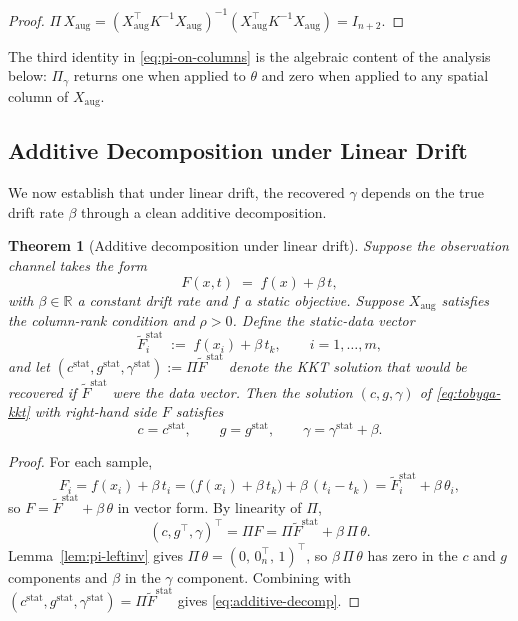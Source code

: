 \documentclass[11pt,a4paper]{article}
\newcommand{\R}{\mathbb{R}}
\newtheorem{theorem}{Theorem}[section]
\begin{document}
\begin{proof}
$\Pi\,X_{\mathrm{aug}}
= (X_{\mathrm{aug}}^\top K^{-1} X_{\mathrm{aug}})^{-1}
  (X_{\mathrm{aug}}^\top K^{-1} X_{\mathrm{aug}}) = I_{n+2}$.
\end{proof}

The third identity in \eqref{eq:pi-on-columns} is the algebraic
content of the analysis below: $\Pi_\gamma$ returns one when
applied to $\theta$ and zero when applied to any spatial column
of $X_{\mathrm{aug}}$.

\subsection{Additive Decomposition under Linear Drift}
\label{sec:linear-drift}

We now establish that under linear drift, the recovered $\gamma$
depends on the true drift rate $\beta$ through a clean additive
decomposition.

\begin{theorem}[Additive decomposition under linear drift]
\label{thm:linear-drift-decomp}
Suppose the observation channel takes the form
\begin{equation}\label{eq:linear-drift-channel}
  F(x, t) \;=\; f(x) + \beta\,t,
\end{equation}
with $\beta \in \R$ a constant drift rate and $f$ a static
objective. Suppose $X_{\mathrm{aug}}$ satisfies the column-rank
condition and $\rho > 0$. Define the static-data vector
\begin{equation}\label{eq:Fstat-def}
  \tilde F^{\mathrm{stat}}_i \;:=\; f(x_i) + \beta\,t_k,
  \qquad i = 1, \dots, m,
\end{equation}
and let
$(c^{\mathrm{stat}}, g^{\mathrm{stat}}, \gamma^{\mathrm{stat}})
:= \Pi \tilde F^{\mathrm{stat}}$
denote the KKT solution that would be recovered if
$\tilde F^{\mathrm{stat}}$ were the data vector. Then the
solution $(c, g, \gamma)$ of \eqref{eq:tobyqa-kkt} with right-hand
side $F$ satisfies
\begin{equation}\label{eq:additive-decomp}
  c = c^{\mathrm{stat}},
  \qquad
  g = g^{\mathrm{stat}},
  \qquad
  \gamma = \gamma^{\mathrm{stat}} + \beta.
\end{equation}
\end{theorem}

\begin{proof}
For each sample,
\[
  F_i = f(x_i) + \beta\,t_i
      = \bigl(f(x_i) + \beta\,t_k\bigr) + \beta\,(t_i - t_k)
      = \tilde F^{\mathrm{stat}}_i + \beta\,\theta_i,
\]
so $F = \tilde F^{\mathrm{stat}} + \beta\,\theta$ in vector form.
By linearity of $\Pi$,
\[
  (c, g^\top, \gamma)^\top
  = \Pi F
  = \Pi \tilde F^{\mathrm{stat}} + \beta\,\Pi\,\theta.
\]
Lemma~\ref{lem:pi-leftinv} gives
$\Pi\,\theta = (0,\, 0_n^\top,\, 1)^\top$, so
$\beta\,\Pi\,\theta$ has zero in the $c$ and $g$ components and
$\beta$ in the $\gamma$ component. Combining with
$(c^{\mathrm{stat}}, g^{\mathrm{stat}}, \gamma^{\mathrm{stat}})
= \Pi \tilde F^{\mathrm{stat}}$ gives
\eqref{eq:additive-decomp}.
\end{proof}
\end{document}
